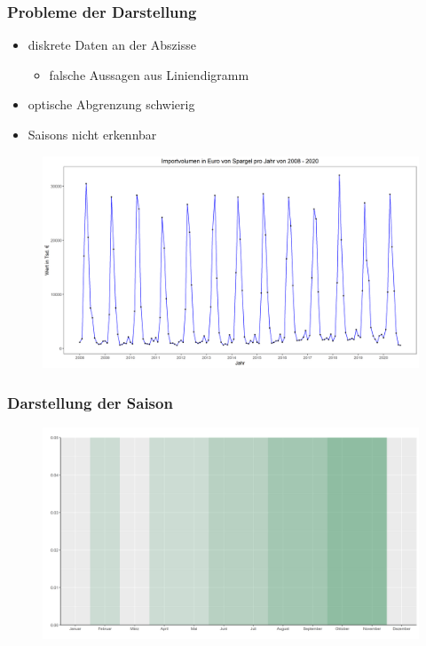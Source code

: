 \documentclass{beamer}
\begin{document}
\begin{frame}
	\frametitle{Probleme der Darstellung}
	\begin{itemize}
		\item diskrete Daten an der Abszisse
		\begin{itemize}
			\item falsche Aussagen aus Liniendigramm 
		\end{itemize}
		\item optische Abgrenzung schwierig
		\item Saisons nicht erkennbar
	\end{itemize}

	\begin{figure}[b]
		\centering
		\includegraphics[scale=0.3]{Marco_2_Folie}
	\end{figure}
\end{frame}

\begin{frame}
	\frametitle{Darstellung der Saison}
	\begin{figure}
		\centering
		\includegraphics[scale=0.35]{Marco_3_Folie}
	\end{figure}
\end{frame}
\end{document}
